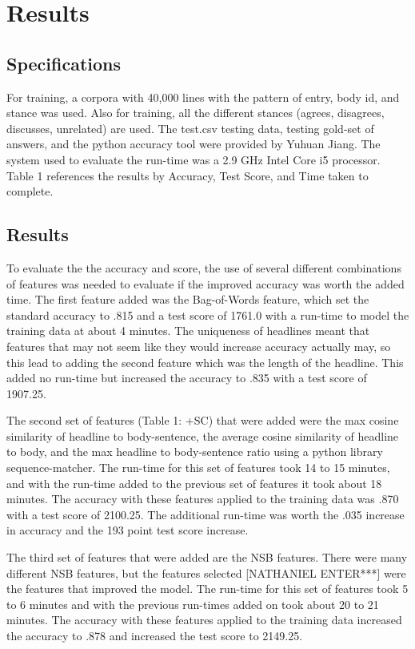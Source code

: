 \documentclass[11pt,a4paper]{article}
\begin{document}
\section{Results}
\subsection{Specifications}
For training, a corpora with 40,000 lines with the pattern of entry, body id, and stance was used. Also for training, all the different stances (agrees, disagrees, discusses, unrelated) are used. The test.csv testing data, testing gold-set of answers, and the python accuracy tool were provided by Yuhuan Jiang. The system used to evaluate the run-time was a 2.9 GHz Intel Core i5 processor. Table 1 references the results by Accuracy, Test Score, and Time taken to complete. 
\subsection{Results}
To evaluate the the accuracy and score, the use of several different combinations of features was needed to evaluate if the improved accuracy was worth the added time. The first feature added was the Bag-of-Words feature, which set the standard accuracy to .815 and a test score of 1761.0 with a run-time to model the training data at about 4 minutes. The uniqueness of headlines meant that features that may not seem like they would increase accuracy actually  may, so this lead to adding the second feature which was the length of the headline. This added no run-time but increased the accuracy to .835 with a test score of 1907.25.

The second set of features (Table 1: +SC) that were added were the max cosine similarity of headline to body-sentence, the average cosine similarity of headline to body, and the max headline to body-sentence ratio using a python library sequence-matcher. The run-time for this set of features took 14 to 15 minutes, and with the run-time added to the previous set of features it took about 18 minutes. The accuracy with these features applied to the training data was     .870 with a test score of 2100.25. The additional run-time was worth the .035 increase in accuracy and the 193 point test score increase. 

The third set of features that were added are the NSB features. There were many different NSB features, but the features selected [NATHANIEL ENTER***] were the features that improved the model. The run-time for this set of features took 5 to 6 minutes and with the previous run-times added on took about 20 to 21 minutes. The accuracy with these features applied to the training data increased the accuracy to .878 and increased the test score to 2149.25. 
\end{document}
